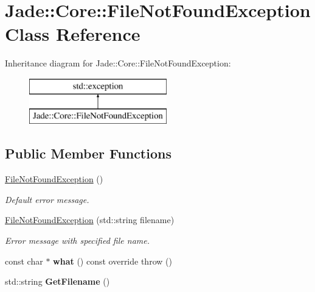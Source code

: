 \hypertarget{class_jade_1_1_core_1_1_file_not_found_exception}{}\section{Jade\+:\+:Core\+:\+:File\+Not\+Found\+Exception Class Reference}
\label{class_jade_1_1_core_1_1_file_not_found_exception}
Inheritance diagram for Jade\+:\+:Core\+:\+:File\+Not\+Found\+Exception\+:\begin{figure}[H]
\begin{center}
\leavevmode
\includegraphics[height=2.000000cm]{class_jade_1_1_core_1_1_file_not_found_exception}
\end{center}
\end{figure}
\subsection*{Public Member Functions}
\begin{DoxyCompactItemize}
\item 
\hypertarget{class_jade_1_1_core_1_1_file_not_found_exception_ab236472ab38c52e761d895179205b847}{}\hyperlink{class_jade_1_1_core_1_1_file_not_found_exception_ab236472ab38c52e761d895179205b847}{File\+Not\+Found\+Exception} ()\label{class_jade_1_1_core_1_1_file_not_found_exception_ab236472ab38c52e761d895179205b847}

\begin{DoxyCompactList}\small\item\em Default error message. \end{DoxyCompactList}\item 
\hypertarget{class_jade_1_1_core_1_1_file_not_found_exception_aaf22ce3ffc2535d362755638a90a0196}{}\hyperlink{class_jade_1_1_core_1_1_file_not_found_exception_aaf22ce3ffc2535d362755638a90a0196}{File\+Not\+Found\+Exception} (std\+::string filename)\label{class_jade_1_1_core_1_1_file_not_found_exception_aaf22ce3ffc2535d362755638a90a0196}

\begin{DoxyCompactList}\small\item\em Error message with specified file name. \end{DoxyCompactList}\item 
\hypertarget{class_jade_1_1_core_1_1_file_not_found_exception_ad6478590ecd5056fac36a45f02a21b8f}{}const char $\ast$ {\bfseries what} () const  override  throw ()\label{class_jade_1_1_core_1_1_file_not_found_exception_ad6478590ecd5056fac36a45f02a21b8f}

\item 
\hypertarget{class_jade_1_1_core_1_1_file_not_found_exception_ae58c1710126d769e0cd895659cfa0af3}{}std\+::string {\bfseries Get\+Filename} ()\label{class_jade_1_1_core_1_1_file_not_found_exception_ae58c1710126d769e0cd895659cfa0af3}

\end{DoxyCompactItemize}


